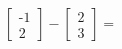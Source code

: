 \documentclass[preview]{standalone}
\begin{document}
\begin{align*}
\begin{bmatrix} \text{-}1 \\ 2 \end{bmatrix} - \begin{bmatrix} 2 \\ 3 \end{bmatrix} =
\end{align*}
\end{document}
